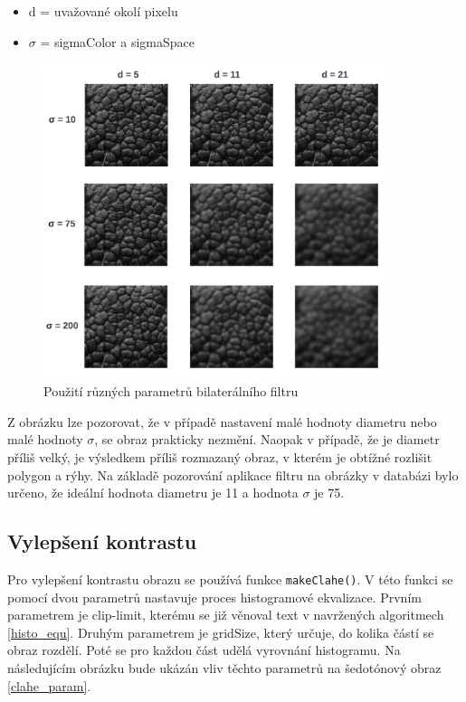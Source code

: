\begin{itemize}
    \item d = uvažované okolí pixelu
    \item $ \sigma $ = sigmaColor a sigmaSpace
\end{itemize}


\begin{figure}[h]
	\centering
	\includegraphics[width=0.9\textwidth]{obrazky/bilateral_param2.jpg}
	\caption{Použití různých parametrů bilaterálního filtru}
	\label{bilateral_param}
\end{figure} 

Z obrázku lze pozorovat, že v případě nastavení malé hodnoty diametru nebo malé hodnoty $ \sigma $, se obraz prakticky nezmění. Naopak v případě, že je diametr příliš velký, je výsledkem příliš rozmazaný obraz, v kterém je obtížné rozlišit polygon a rýhy. Na základě pozorování aplikace filtru na obrázky v databázi bylo určeno, že ideální hodnota diametru je 11 a hodnota $ \sigma $ je 75. 

\subsection{Vylepšení kontrastu}
Pro vylepšení kontrastu obrazu se používá funkce \texttt{makeClahe()}. V této funkci se pomocí dvou parametrů nastavuje proces histogramové ekvalizace. Prvním parametrem je clip-limit, kterému se již věnoval text v navržených algoritmech \ref{histo_equ}. Druhým parametrem je gridSize, který určuje, do kolika částí se obraz rozdělí. Poté se pro každou část udělá vyrovnání histogramu. Na následujícím obrázku bude ukázán vliv těchto parametrů na šedotónový obraz \ref{clahe_param}.


